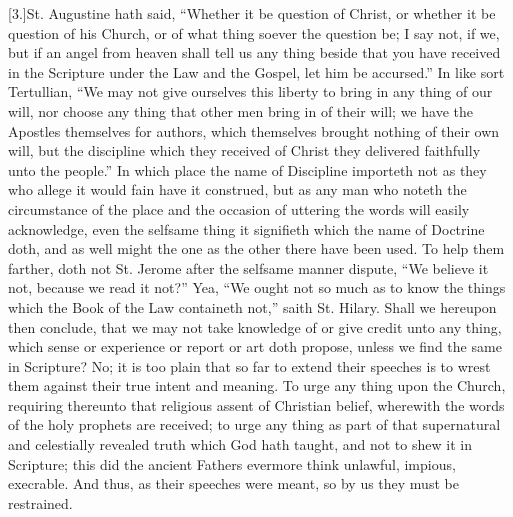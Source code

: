 [3.]St. Augustine hath said, “Whether it be question of Christ, or whether it be question of his Church, or of what thing soever the question be; I say not, if we, but if an angel from heaven shall tell us any thing beside that you have received in the Scripture under the Law and the Gospel, let him be accursed.” In like sort Tertullian, “We may not give ourselves this liberty to bring in any thing of our will, nor choose any thing that other men bring in of their will; we have the Apostles themselves for authors, which themselves brought nothing of their own will, but the discipline which they received of Christ they delivered faithfully unto the people.” In which place the name of Discipline importeth not as they who allege it would fain have it construed, but as any man who noteth the circumstance of the place and the occasion of uttering the words will easily acknowledge, even the selfsame thing it signifieth which the name of Doctrine doth, and as well might the one as the other there have been used. To help them farther, doth not St. Jerome after the selfsame manner dispute, “We believe it  not, because we read it not?” Yea, “We ought not so much as to know the things which the Book of the Law containeth not,” saith St. Hilary. Shall we hereupon then conclude, that we may not take knowledge of or give credit unto any thing, which sense or experience or report or art doth propose, unless we find the same in Scripture? No; it is too plain that so far to extend their speeches is to wrest them against their true intent and meaning. To urge any thing upon the Church, requiring thereunto that religious assent of Christian belief, wherewith the words of the holy prophets are received; to urge any thing as part of that supernatural and celestially revealed truth which God hath taught, and not to shew it in Scripture; this did the ancient Fathers evermore think unlawful, impious, execrable. And thus, as their speeches were meant, so by us they must be restrained.

